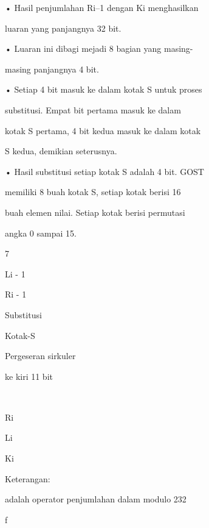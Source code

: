 \documentclass{article}
\begin{document}

• Hasil penjumlahan Ri–1 dengan Ki menghasilkan 

luaran yang panjangnya 32 bit. 

• Luaran ini dibagi mejadi 8 bagian yang masing-

masing panjangnya 4 bit. 

• Setiap 4 bit masuk ke dalam kotak S untuk proses 

substitusi. Empat bit pertama masuk ke dalam 

kotak S pertama, 4 bit kedua masuk ke dalam kotak 

S kedua, demikian seterusnya. 

• Hasil substitusi setiap kotak S adalah 4 bit. GOST 

memiliki 8 buah kotak S, setiap kotak berisi 16 

buah elemen nilai. Setiap kotak berisi permutasi 

angka 0 sampai 15. 

7

Li - 1

Ri - 1

Substitusi

Kotak-S

Pergeseran sirkuler

ke kiri 11 bit



Ri

Li

Ki

Keterangan:

adalah operator penjumlahan dalam modulo 232

f
\end{document}
